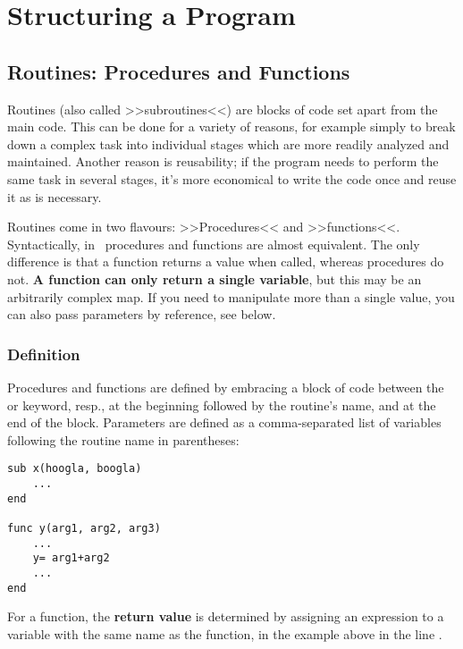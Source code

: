 \chapter{Structuring a Program}


\section{Routines: Procedures and Functions}

Routines (also called >>subroutines<<) are blocks of code set apart from
the main code. This can be done for a variety of reasons, for example
simply to break down a complex task into individual stages which are
more readily analyzed and maintained. Another reason is reusability; if
the program needs to perform the same task in several stages, it's more
economical to write the code once and reuse it as is necessary.

Routines come in two flavours: >>Procedures<< and >>functions<<.
Syntactically, in \SB\ procedures and functions are almost equivalent.
The only difference is that a function returns a value when called,
whereas procedures do not. \textbf{A function can only return a single
variable}, but this may be an arbitrarily complex map. If you need to
manipulate more than a single value, you can also pass parameters by
reference, see  below.

\subsection{Definition}

Procedures and functions are defined by embracing a block of code
between the  or  keyword, resp., at the beginning
followed by the routine's name, and  at the end of the block.
Parameters are defined as a comma-separated list of variables following
the routine name in parentheses:

\begin{lstlisting}
sub x(hoogla, boogla)
	...
end

func y(arg1, arg2, arg3)
	...
	y= arg1+arg2
	...
end
\end{lstlisting}

For a function, the \textbf{return value} is determined by assigning an
expression to a variable with the same name as the function, in the
example above in the line .

